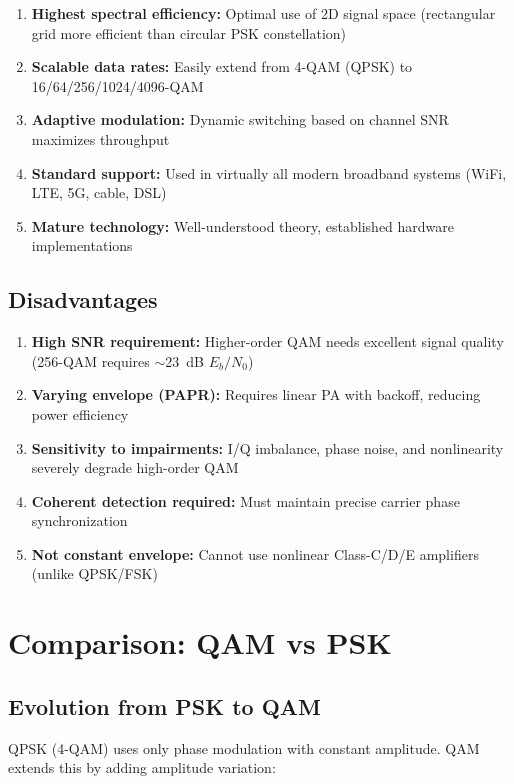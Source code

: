 \begin{enumerate}
\item \textbf{Highest spectral efficiency:} Optimal use of 2D signal space (rectangular grid more efficient than circular PSK constellation)
\item \textbf{Scalable data rates:} Easily extend from 4-QAM (QPSK) to 16/64/256/1024/4096-QAM
\item \textbf{Adaptive modulation:} Dynamic switching based on channel SNR maximizes throughput
\item \textbf{Standard support:} Used in virtually all modern broadband systems (WiFi, LTE, 5G, cable, DSL)
\item \textbf{Mature technology:} Well-understood theory, established hardware implementations
\end{enumerate}

\subsection*{Disadvantages}

\begin{enumerate}
\item \textbf{High SNR requirement:} Higher-order QAM needs excellent signal quality (256-QAM requires $\sim$23~dB $E_b/N_0$)
\item \textbf{Varying envelope (PAPR):} Requires linear PA with backoff, reducing power efficiency
\item \textbf{Sensitivity to impairments:} I/Q imbalance, phase noise, and nonlinearity severely degrade high-order QAM
\item \textbf{Coherent detection required:} Must maintain precise carrier phase synchronization
\item \textbf{Not constant envelope:} Cannot use nonlinear Class-C/D/E amplifiers (unlike QPSK/FSK)
\end{enumerate}

\section{Comparison: QAM vs PSK}

\subsection{Evolution from PSK to QAM}

QPSK (4-QAM) uses only phase modulation with constant amplitude. QAM extends this by adding amplitude variation:

